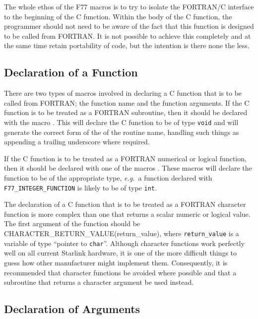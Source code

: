 \documentclass[twoside,11pt,nolof]{starlink}
\begin{document}
The whole ethos of the F77 macros is to try to isolate the FORTRAN/C
interface to the beginning of the C function. Within the body of the C
function, the programmer should not need to be aware of the fact that this
function is designed to be called from FORTRAN\@. It is not possible to achieve
this completely and at the same time retain portability of code, but the
intention is there none the less.

\subsection{Declaration of a Function}

There are two types of macros involved in declaring a C function that is to be
called from FORTRAN; the function name and the function arguments. If the C
function is to be treated as a FORTRAN subroutine, then it should be declared
with the macro
.
This will declare the C function to be of type \texttt{void} and will generate
the correct form of the of the routine name, handling such things as appending
a trailing underscore where required.

If the C function is to be treated as a FORTRAN numerical or logical function,
then it should be declared with one of the macros
.
These macros will declare the function to be of the appropriate type,
\textit{e.g.}\ a function declared with
\texttt{F77\_\-INTEGER\_\-FUNCTION} is
likely to be of type \texttt{int}.

The declaration of a C function that is to be treated as a FORTRAN character
function is more complex than one that returns a scalar numeric or logical
value. The first argument of the function should be
{CHARACTER_RETURN_VALUE}(return\_value),
where
\texttt{return\_value} is a variable of type ``pointer to \texttt{char}''.
Although character functions work
perfectly well on all current Starlink hardware, it is one of the more
difficult things to guess how other manufacturer might implement them.
Consequently, it is recommended that character functions be avoided where
possible and that a subroutine that returns a character argument be used
instead.

\subsection{Declaration of Arguments}
\end{document}
